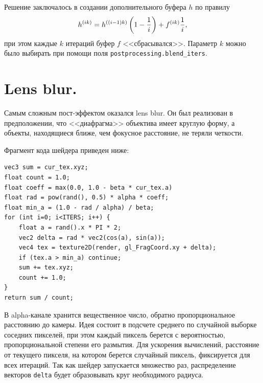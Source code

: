 Решение заключалось в создании дополнительного буфера $h$ по правилу
$$h^{(ik)} = h^{((i - 1)k)} \left(1 - \frac{1}{i}\right) + f^{(ik)}\frac{1}{i},$$
при этом каждые $k$ итераций буфер $f$ <<сбрасывался>>.
Параметр $k$ можно было выбирать при помощи поля \texttt{postprocessing.blend\_iters}.

\section{Lens blur.}

Самым сложным пост-эффектом оказался lens blur. Он был реализован в предположении, что <<диафрагма>> объектива имеет круглую форму, а объекты, находящиеся ближе, чем фокусное расстояние, не теряли четкости.

Фрагмент кода шейдера приведен ниже:
\begin{verbatim}
vec3 sum = cur_tex.xyz;
float count = 1.0;
float coeff = max(0.0, 1.0 - beta * cur_tex.a)
float rad = pow(rand(), 0.5) * alpha * coeff;
float min_a = (1.0 - rad / alpha) / beta;
for (int i=0; i<ITERS; i++) {
    float a = rand().x * PI * 2;
    vec2 delta = rad * vec2(cos(a), sin(a));
    vec4 tex = texture2D(render, gl_FragCoord.xy + delta);
    if (tex.a > min_a) continue;
    sum += tex.xyz;
    count += 1.0;
}
return sum / count;
\end{verbatim}
В alpha-канале хранится вещественное число, обратно пропорциональное расстоянию до камеры. Идея состоит в подсчете среднего по случайной выборке соседних пикселей, при этом каждый пиксель берется с вероятностью, пропорциональной степени его размытия. Для ускорения вычислений, расстояние от текущего пикселя, на котором берется случайный пиксель, фиксируется для всех итераций. Так как шейдер запускается множество раз, распределение векторов \texttt{delta} будет образовывать круг необходимого радиуса.
